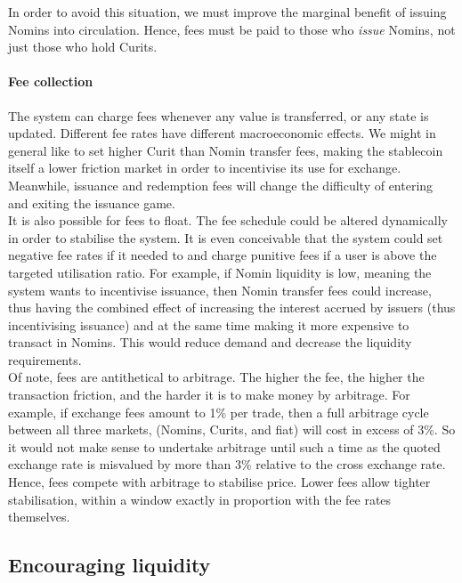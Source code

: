 \noindent In order to avoid this situation, we must improve the marginal benefit of issuing Nomins into circulation.
Hence, fees must be paid to those who \textit{issue} Nomins, not just those who hold Curits.

\paragraph{Fee collection}

The system can charge fees whenever any value is transferred, or any state is updated.
\noindent Different fee rates have different macroeconomic effects. We might in general like to set higher Curit than Nomin transfer fees, making the stablecoin itself a lower friction market in order to incentivise its use for exchange. Meanwhile, issuance and redemption fees will change the difficulty of entering and exiting the issuance game. \\

\noindent It is also possible for fees to float. The fee schedule could be altered dynamically in order to stabilise the system. It is even conceivable that the system could set negative fee rates if it needed to and charge punitive fees if a user is above the targeted utilisation ratio. For example, if Nomin liquidity is low, meaning the system wants to incentivise issuance, then Nomin transfer fees could increase, thus having the combined effect of increasing the interest accrued by issuers (thus incentivising issuance) and at the same time making it more expensive to transact in Nomins. This would reduce demand and decrease the liquidity requirements. \\

\noindent Of note, fees are antithetical to arbitrage. The higher the fee, the higher the transaction friction, and the harder it is to make money by arbitrage. For example, if exchange fees amount to 1\% per trade, then a full arbitrage cycle between all three markets, (Nomins, Curits, and fiat) will cost in excess of 3\%. So it would not make sense to undertake arbitrage until such a time as the quoted exchange rate is misvalued by more than 3\% relative to the cross exchange rate. Hence, fees compete with arbitrage to stabilise price. Lower fees allow tighter stabilisation, within a window exactly in proportion with the fee rates themselves.

\subsection{Encouraging liquidity}

